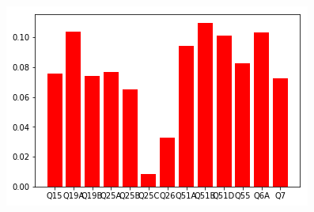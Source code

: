 {\begin{figure}[t!]
\begin{minipage}{0.24\textwidth}
	\end{minipage}
	\begin{minipage}{0.24\textwidth}%
		\includegraphics[width=\linewidth]{Images/pred_2012.png}
	\end{minipage}\\
	

\end{figure}}
